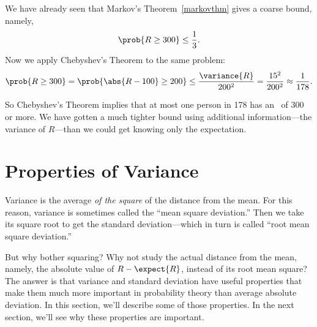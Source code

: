 We have already seen that Markov's Theorem~\ref{markovthm} gives a coarse
bound, namely,
\[
  \prob{R \geq 300} \leq \frac{1}{3}.
\]
Now we apply Chebyshev's Theorem to the same problem:
\[
\prob{R \geq 300} = \prob{\abs{R - 100} \geq 200} \leq
\frac{\variance{R}}{200^2} = \frac{15^2}{200^2} \approx \frac{1}{178}.
\]
\iffalse
The purpose of the first step is to express the desired probability in the
form required by Chebyshev's Theorem; the equality holds because $R$ is
nonnegative.  Chebyshev's Theorem then yields the inequality.\fi

So Chebyshev's Theorem implies that at most one person in 178
has an \IQ\ of 300 or more.  We have gotten a much tighter bound using
additional information---the variance of $R$---than we could get
knowing only the expectation.

\begin{problems}
\examproblems
{}
\end{problems}

\section{Properties of Variance}\label{variance_sec}
Variance is the average \emph{of the square} of the distance from the
mean.  For this reason, variance is sometimes called the ``mean square
deviation.''  Then we take its square root to get the standard
deviation---which in turn is called ``root mean square deviation.''

But why bother squaring?  Why not study the actual distance from the
mean, namely, the absolute value of $R - \expect{R}$, instead of its
root mean square?  The answer is that variance and standard
deviation have useful properties that make them much more important in
probability theory than average absolute deviation.  In this section,
we'll describe some of those properties.  In the next section, we'll
see why these properties are important.

\iffalse
Focus on the variance and standard deviation of $R$ may seem a little
unexpected.  After all, these definitions arose from asking about the
probability that the absolute deviation $\abs{R - \expect{R}}$ was
large.  To get a better grip on the probability of deviation, we
squared it to get the Chebyshev Bound, this led us to the convoluted
concept of root mean square deviation.
\fi

